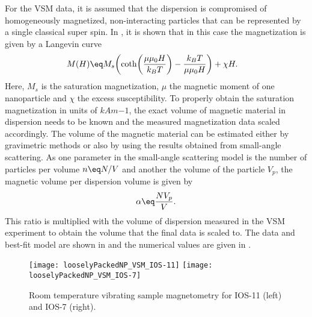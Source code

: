 \documentclass[\main/dresen_thesis.tex]{subfiles}
\begin{document}
For the VSM data, it is assumed that the dispersion is compromised of homogeneously magnetized, non-interacting particles that can be represented by a single classical super spin.
In , it is shown that in this case the magnetization is given by a Langevin curve
\begin{align}
  M(H) \eq& M_s \biggl( \coth \biggl(\frac{\mu \mu_0 H}{k_B T} \biggr) - \frac{k_B T}{\mu \mu_0 H} \biggr) + \chi H.
\end{align}
Here, $M_s$ is the saturation magnetization, $\mu$ the magnetic moment of one nanoparticle and $\chi$ the excess susceptibility.
To properly obtain the saturation magnetization in units of $\unit{kAm{-1}}$, the exact volume of magnetic material in dispersion needs to be known and the measured magnetization data scaled accordingly.
The volume of the magnetic material can be estimated either by gravimetric methods or also by using the results obtained from small-angle scattering.
As one parameter in the small-angle scattering model is the number of particles per volume $n \eq N/V$ and another the volume of the particle $V_p$, the magnetic volume per dispersion volume is given by
\begin{align}
  \alpha \eq \frac{N V_p}{V}.
\end{align}
This ratio is multiplied with the volume of dispersion measured in the VSM experiment to obtain the volume that the final data is scaled to.
The data and best-fit model are shown in  and the numerical values are given in .

\begin{figure}[tb]
  \centering
  \texttt{[image: looselyPackedNP\_VSM\_IOS-11]}
  \texttt{[image: looselyPackedNP\_VSM\_IOS-7]}
  \caption{\label{fig:looselyPackedNP:nanoparticle:vsm}Room temperature vibrating sample magnetometry for IOS-11 (left) and IOS-7 (right).}
\end{figure}
\end{document}
